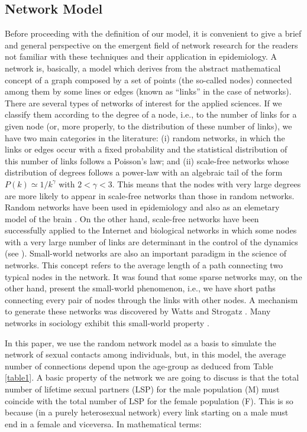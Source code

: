 \subsection{Network Model}

Before proceeding with the definition of our model, it is convenient to give a brief and general perspective on the emergent field
of network research for the readers not familiar with these techniques and their application in epidemiology. A network is, basically, a model which derives from the abstract mathematical concept of a graph composed by a set of points (the so-called nodes) connected among them by some lines or edges (known as ``links'' in the case of networks).
There are several types of networks of interest for the applied sciences. If we classify them according to the degree of a node, i.e., to the number of links for a given node (or, more properly, to the distribution of these number of links), we have two main categories in the literature: (i) random networks, in which the links or edges occur with a fixed probability and the statistical distribution of this number of links follows a Poisson's law; and (ii) scale-free networks whose distribution of degrees follows a power-law with an
algebraic tail of the form $P(k) \simeq 1/k^\gamma$ with $2 < \gamma < 3$. This means that the nodes with very large degrees are more likely to appear in scale-free networks than those in random networks. Random networks have been used in epidemiology
\cite{RSV} and also as an elemetary model of the brain \cite{Acedo2013}. On the other hand, scale-free networks have been successfully applied to the Internet and biological networks in which some nodes with a very large number of links are determinant in the control of the dynamics (see \cite{Dorogovtsev}). Small-world networks are also an important paradigm in the 
science of networks. This concept refers to the average length of a path connecting two typical nodes in the network. It was found that some sparse networks may, on the other hand, present the small-world phenomenon, i.e., we have short paths connecting every pair of nodes through the links with other nodes. A mechanism to generate these networks was discovered by
Watts and Strogatz \cite{Watts}. Many networks in sociology exhibit this small-world property \cite{Obesity,Web,Bearman}.

In this paper, we use the random network model as a basis to simulate the network of sexual contacts among individuals, but, in this model, the average number of connections depend upon the age-group as deduced from Table \ref{table1}. A basic property of the network we are going to discuss is that the total number of lifetime sexual partners (LSP) for the male population (M) must
coincide with the total number of LSP for the female population (F). This is so because (in a purely heterosexual network) every link starting on a male must end in a female and viceversa. In mathematical terms:

